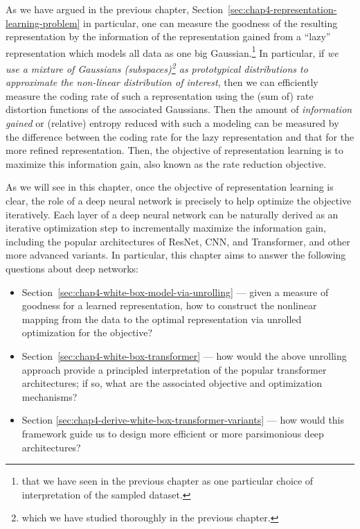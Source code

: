 \documentclass[\toplevelprefix/book-main.tex]{subfiles}
\begin{document}
As we have argued in the previous chapter, Section~\ref{sec:chap4-representation-learning-problem} in particular, one can measure the goodness of the resulting representation by the information of the representation gained from a ``lazy'' representation which models all data as one big Gaussian.\footnote{that we have seen in the previous chapter as one particular choice of interpretation of the sampled dataset.} In particular, if \textit{we use a mixture of Gaussians (subspaces)\footnote{which we have studied thoroughly in the previous chapter.} as prototypical distributions to approximate the non-linear distribution of interest}, then we can efficiently measure the coding rate of such a representation using the (sum of) rate distortion functions of the associated Gaussians. Then the amount of {\em information gained} or (relative) entropy reduced with such a modeling can be measured by the difference between the coding rate for the lazy representation and that for the more refined representation. Then,  the objective of representation learning is to maximize this information gain, also known as the rate reduction objective. 

As we will see in this chapter, once the objective of representation learning is clear, the role of a deep neural network is precisely to help optimize the objective iteratively. Each layer of a deep neural network can be naturally derived as an iterative optimization step to incrementally maximize the information gain, including the popular architectures of ResNet, CNN, and Transformer, and other more advanced variants. In particular, this chapter aims to answer the following questions about deep networks:
\begin{itemize}
    \item Section~\ref{sec:chap4-white-box-model-via-unrolling} --- given a measure of goodness for a learned representation, how to construct the nonlinear mapping from the data to the optimal representation via unrolled optimization for the objective?
    \item Section~\ref{sec:chap4-white-box-transformer} --- how would the above unrolling approach provide a principled interpretation of the popular transformer architectures; if so, what are the associated objective and optimization mechanisms? 
    \item Section \ref{sec:chap4-derive-white-box-transformer-variants} --- how would this framework guide us to design more efficient or more parsimonious deep architectures?
\end{itemize}
\end{document}
